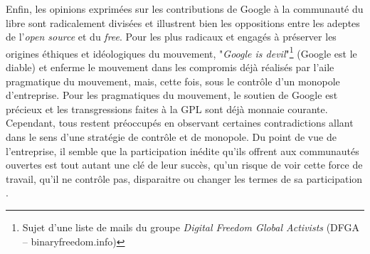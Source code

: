 Enfin, les opinions exprimées sur les contributions de Google à la communauté du libre sont radicalement divisées et illustrent bien les oppositions entre les adeptes de l'\emph{open source} et du \emph{free}. Pour les plus radicaux et engagés à préserver les origines éthiques et idéologiques du mouvement, "\emph{Google is devil}"\footnote{Sujet d'une liste de mails du groupe \emph{Digital Freedom Global Activists} (DFGA -- binaryfreedom.info)} (Google est le diable) et enferme le mouvement dans les compromis déjà réalisés par l'aile pragmatique du mouvement, mais, cette fois, sous le contrôle d'un monopole d'entreprise. Pour les pragmatiques du mouvement, le soutien de Google est précieux et les transgressions faites à la GPL sont déjà monnaie courante. Cependant, tous restent préoccupés en observant certaines contradictions allant dans le sens d'une stratégie de contrôle et de monopole. Du point de vue de l'entreprise, il semble que la participation inédite qu'ils offrent aux communautés ouvertes est tout autant une clé de leur succès, qu'un risque de voir cette force de travail, qu'il ne contrôle pas, disparaitre ou changer les termes de sa participation \citep{Fabernovel2008, Fabernovel2009}.
